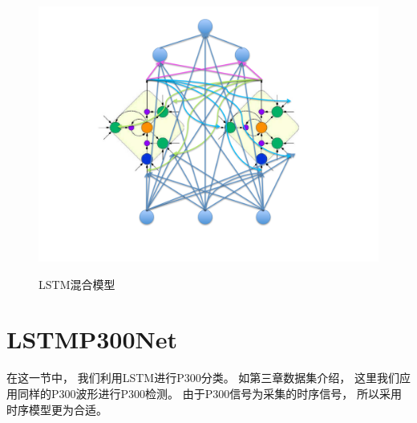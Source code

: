 \begin{figure}[htb]
  \centering
  \includegraphics[scale = 0.5]{Pictures/LSTM/lstm_mixture_model.pdf}\\
  \caption{LSTM混合模型}\label{Fig:lstm_mixture}
\end{figure}



\section{LSTMP300Net}

在这一节中， 我们利用LSTM进行P300分类。 如第三章数据集介绍， 这里我们应用同样的P300波形进行P300检测。 由于P300信号为采集的时序信号， 所以采用时序模型更为合适。 



